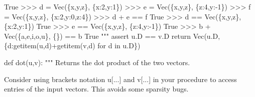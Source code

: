 \documentclass[
  letterpaper,
  DIV=11,
  numbers=noendperiod]{scrartcl}
\newenvironment{Shaded}{\begin{snugshade}}{\end{snugshade}}
\newcommand{\CommentTok}[1]{\textcolor[rgb]{0.37,0.37,0.37}{#1}}
\newcommand{\ControlFlowTok}[1]{\textcolor[rgb]{0.00,0.23,0.31}{#1}}
\newcommand{\KeywordTok}[1]{\textcolor[rgb]{0.00,0.23,0.31}{#1}}
\newcommand{\NormalTok}[1]{\textcolor[rgb]{0.00,0.23,0.31}{#1}}
\newcommand{\OperatorTok}[1]{\textcolor[rgb]{0.37,0.37,0.37}{#1}}
\begin{document}
\begin{Shaded}
\begin{Highlighting}[numbers=left,,]
\CommentTok{    True}
\CommentTok{    \textgreater{}\textgreater{}\textgreater{} d = Vec(\{\textquotesingle{}x\textquotesingle{},\textquotesingle{}y\textquotesingle{},\textquotesingle{}z\textquotesingle{}\}, \{\textquotesingle{}x\textquotesingle{}:2,\textquotesingle{}y\textquotesingle{}:1\})}
\CommentTok{    \textgreater{}\textgreater{}\textgreater{} e = Vec(\{\textquotesingle{}x\textquotesingle{},\textquotesingle{}y\textquotesingle{},\textquotesingle{}z\textquotesingle{}\}, \{\textquotesingle{}z\textquotesingle{}:4,\textquotesingle{}y\textquotesingle{}:{-}1\})}
\CommentTok{    \textgreater{}\textgreater{}\textgreater{} f = Vec(\{\textquotesingle{}x\textquotesingle{},\textquotesingle{}y\textquotesingle{},\textquotesingle{}z\textquotesingle{}\}, \{\textquotesingle{}x\textquotesingle{}:2,\textquotesingle{}y\textquotesingle{}:0,\textquotesingle{}z\textquotesingle{}:4\})}
\CommentTok{    \textgreater{}\textgreater{}\textgreater{} d + e == f}
\CommentTok{    True}
\CommentTok{    \textgreater{}\textgreater{}\textgreater{} d == Vec(\{\textquotesingle{}x\textquotesingle{},\textquotesingle{}y\textquotesingle{},\textquotesingle{}z\textquotesingle{}\}, \{\textquotesingle{}x\textquotesingle{}:2,\textquotesingle{}y\textquotesingle{}:1\})}
\CommentTok{    True}
\CommentTok{    \textgreater{}\textgreater{}\textgreater{} e == Vec(\{\textquotesingle{}x\textquotesingle{},\textquotesingle{}y\textquotesingle{},\textquotesingle{}z\textquotesingle{}\}, \{\textquotesingle{}z\textquotesingle{}:4,\textquotesingle{}y\textquotesingle{}:{-}1\})}
\CommentTok{    True}
\CommentTok{    \textgreater{}\textgreater{}\textgreater{} b + Vec(\{\textquotesingle{}a\textquotesingle{},\textquotesingle{}e\textquotesingle{},\textquotesingle{}i\textquotesingle{},\textquotesingle{}o\textquotesingle{},\textquotesingle{}u\textquotesingle{}\}, \{\}) == b}
\CommentTok{    True}
\CommentTok{    """}
    \ControlFlowTok{assert}\NormalTok{ u.D }\OperatorTok{==}\NormalTok{ v.D}
    \ControlFlowTok{return}\NormalTok{ Vec(u.D, \{d:getitem(u,d)}\OperatorTok{+}\NormalTok{getitem(v,d) }\ControlFlowTok{for}\NormalTok{ d }\KeywordTok{in}\NormalTok{ u.D\})}

\KeywordTok{def}\NormalTok{ dot(u,v):}
    \CommentTok{"""}
\CommentTok{    Returns the dot product of the two vectors.}

\CommentTok{    Consider using brackets notation u[...] and v[...] in your procedure}
\CommentTok{    to access entries of the input vectors.  This avoids some sparsity bugs.}


\end{Highlighting}
\end{Shaded}
\end{document}
